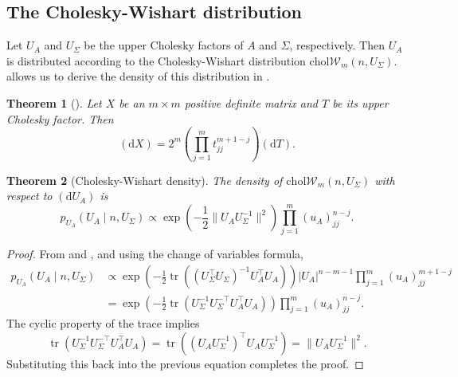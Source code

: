 \documentclass[12pt,a4paper,reqno]{amsart}
\numberwithin{equation}{section}
\newtheorem{theorem}{Theorem}[section]
\newcommand{\cholwishart}[1]{\mathrm{chol}\mathcal{W}_{#1}}
\renewcommand{\det}[1]{\left| {#1} \right|}
\newcommand{\dmeasure}[1]{\left(\dd{#1}\right)}
\newcommand{\dd}[1]{\mathrm{d}{#1}}
\newcommand{\tr}{\operatorname{tr}}
\begin{document}
\subsection*{The Cholesky-Wishart distribution}

\sloppy
Let $U_A$ and $U_\Sigma$ be the upper Cholesky factors of $A$ and $\Sigma$, respectively.
Then $U_A$ is distributed according to the Cholesky-Wishart distribution $\cholwishart{m}(n, U_\Sigma)$.
 allows us to derive the density of this distribution in .

\begin{theorem}[{\cite[Theorem 2.1.9]{muirhead_aspects_1982}}]\label{thm:choleskydetjac}
    Let $X$ be an $m \times m$ positive definite matrix and $T$ be its upper Cholesky factor.
    Then
    \begin{equation}\label{eq:choleskydetjac}
        \dmeasure{X} = 2^m \left(\prod_{j=1}^m t_{jj}^{m+1-j} \right) \dmeasure{T}.
    \end{equation}
\end{theorem}

\begin{theorem}[Cholesky-Wishart density]\label{thm:cholwishartdensity}
    The density of $\cholwishart{m}(n, U_\Sigma)$ with respect to $\dmeasure{U_A} $ is
    \begin{equation}\label{eq:cholwishartdensity}
        p_{U_A}(U_A \mid n, U_\Sigma) \propto \exp\left(-\frac{1}{2}\lVert U_A U_\Sigma^{-1} \rVert^2\right) \prod_{j=1}^m (u_A)_{jj}^{n-j}.
    \end{equation}
\end{theorem}
\begin{proof}
    From  and , and using the change of variables formula,
    \begin{align*}
        p_{U_A}(U_A \mid n, U_\Sigma) & \propto \exp\left(-\frac{1}{2}\tr((U_\Sigma^\top U_\Sigma)^{-1} U_A^\top U_A)\right) \det{U_A}^{n-m-1} \prod_{j=1}^m (u_A)_{jj}^{m+1-j} \\
                                      & = \exp\left(-\frac{1}{2}\tr(U_\Sigma^{-1} U_\Sigma^{-\top} U_A^\top U_A)\right) \prod_{j=1}^m (u_A)_{jj}^{n-j}.
    \end{align*}
    The cyclic property of the trace implies
    \[\tr(U_\Sigma^{-1} U_\Sigma^{-\top} U_A^\top U_A) = \tr((U_A U_\Sigma^{-1})^\top U_A U_\Sigma^{-1}) = \lVert U_A U_\Sigma^{-1} \rVert^2.\]
    Substituting this back into the previous equation completes the proof.
\end{proof}
\end{document}
